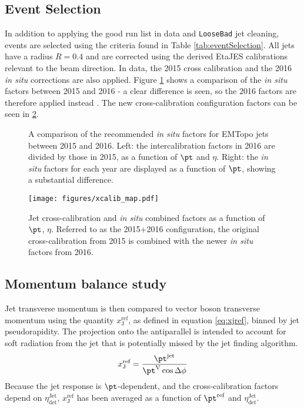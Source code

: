 \documentclass[NOTE, atlasdraft=true, texlive=2016, USenglish]{\ATLASLATEXPATH atlasdoc}
\begin{document}
\subsection{Event Selection}
In addition to applying the good run list in data and \texttt{LooseBad} jet cleaning, events are selected using the criteria found in Table \ref{tab:eventSelection}. All jets have a radius $R=0.4$ and are corrected using the derived EtaJES calibrations relevant to the beam direction. In data, the 2015 cross calibration and the 2016 \textit{in situ} corrections are also applied. Figure \ref{fig:insituComp} shows a comparison of the \textit{in situ} factors between 2015 and 2016 - a clear difference is seen, so the 2016 factors are therefore applied instead \cite{ATLAS-CONF-2015-017}. The new cross-calibration configuration factors can be seen in \ref{fig:newXCalib}.
\begin{figure}[htbp]
	\centering
	\caption{A comparison of the recommended \textit{in situ} factors for EMTopo jets between 2015 and 2016. Left: the intercalibration factors in 2016 are divided by those in 2015, as a function of $\pt$ and $\eta$. Right: the \textit{in situ} factors for each year are displayed as a function of $\pt$, showing a substantial difference.}
	\label{fig:insituComp}
\end{figure}
\begin{figure}[htbp]
	\centering
	\texttt{[image: figures/xcalib\_map.pdf]}
	\caption{Jet cross-calibration and \textit{in situ} combined factors as a function of $\pt$, $\eta$. Referred to as the 2015+2016 configuration, the original cross-calibration from 2015 is combined with the newer \textit{in situ} factors from 2016.}
	\label{fig:newXCalib}
\end{figure}

\subsection{Momentum balance study}
Jet transverse momentum is then compared to vector boson transverse momentum using the quantity $x_{\text{J}}^{\text{ref}}$, as defined in equation \ref{eq:xjref}, binned by jet pseudorapidity. The projection onto the antiparallel is intended to account for soft radiation from the jet that is potentially missed by the jet finding algorithm.
\begin{equation}
	x_{\text{J}}^{\text{ref}} = \frac{\pt^{\text{jet}}}{\pt^{\text{V}} \cos{\Delta\phi}}
	\label{eq:xjref}
\end{equation}
Because the jet response is $\pt$-dependent, and the cross-calibration factors depend on $\eta_{\text{det}}^{\text{Jet}}$, $x_{\text{J}}^{\text{ref}}$ has been averaged as a function of $\pt^{\text{ref}}$ and $\eta_{\text{det}}^{\text{Jet}}$. 
\end{document}
